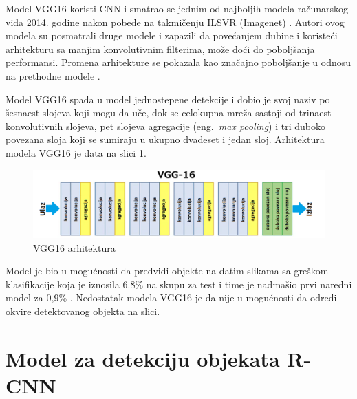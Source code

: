 \documentclass[12pt,oneside]{memoir}
\begin{document}
Model VGG16 koristi CNN i smatrao se jednim od najboljih modela računarskog vida 2014. godine nakon pobede na takmičenju ILSVR (Imagenet) \cite{simonyan2014very}. Autori ovog modela su posmatrali druge modele i zapazili da povećanjem dubine i koristeći arhitekturu sa manjim konvolutivnim filterima, može doći do poboljšanja performansi. Promena arhitekture se pokazala kao značajno poboljšanje u odnosu na prethodne modele \cite{simonyan2014very}. 

Model VGG16 spada u model jednostepene detekcije i dobio je svoj naziv po šesnaest slojeva koji mogu da uče, dok se celokupna mreža sastoji od trinaest konvolutivnih slojeva, pet slojeva agregacije (eng.~\textit{max pooling}) i tri duboko povezana sloja koji se sumiraju u ukupno dvadeset i jedan sloj. Arhitektura modela VGG16 je data na slici \ref{fig:section2_vgg16}.

\begin{figure}[ht]
    \centering
    \includegraphics[width=1\textwidth]{matfmaster/glava2/vgg16_2.png}
    \caption{VGG16 arhitektura}
    \label{fig:section2_vgg16}
\end{figure}

Model je bio u mogućnosti da predvidi objekte na datim slikama sa greškom klasifikacije koja je iznosila 6.8\% na skupu za test i time je nadmašio prvi naredni model za 0,9\% \cite{simonyan2014very}.
Nedostatak modela VGG16 je da nije u mogućnosti da odredi okvire detektovanog objekta na slici.



\section{Model za detekciju objekata R-CNN}
\end{document}
